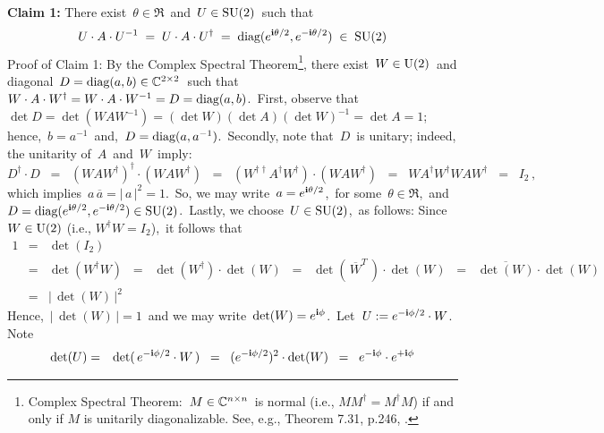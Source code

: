 \begin{enumerate}
	\vskip 0.3cm
	\noindent
	\textbf{Claim 1:}\quad
	There exist
	\,$\theta \in \Re$\,
	and
	\,$U \in \textnormal{SU}(2)$\,
	such that
	\begin{equation*}
	U \cdot A \cdot U^{-1}
	\; = \;
		U \cdot A \cdot U^{\dagger}
	\; = \;
		\textnormal{diag}(e^{\textnormal{\bf i}\theta/2},e^{-\textnormal{\bf i}\theta/2})
	\; \in \;
		\textnormal{SU}(2)
	\end{equation*}
	\vskip 0.1cm
	\noindent
	Proof of Claim 1:\;\;
	By the {\color{red}Complex Spectral Theorem}\footnote{Complex Spectral Theorem:
	\,$M \in \mathbb{C}^{n \times n}$\,
	is normal (i.e., $MM^{\dagger} = M^{\dagger}M$)
	if and only if $M$ is unitarily diagonalizable.
	See, e.g., Theorem 7.31, p.246, \cite{Axler2024}.},
	there exist \,$W \in \textnormal{U}(2)$\, and diagonal
	\,$D = \textnormal{diag}(a,b) \in \mathbb{C}^{2 \times 2}$\,
	such that
	\,$W \cdot A \cdot W^{\dagger} = W \cdot A \cdot W^{-1} = D = \textnormal{diag}(a,b)$.\,
	First, observe that 
	\,$\det D = \det(WAW^{-1}) = (\det W)(\det A)(\det W)^{-1} = \det A = 1$;\,
	hence,
	\,$b = a^{-1}$\,
	and,
	\,$D = \textnormal{diag}(a,a^{-1})$.\,
	Secondly, note that
	\,$D$\, is unitary; indeed, the unitarity of \,$A$\, and \,$W$\, imply:
	\begin{equation*}
	D^{\dagger} \cdot D
	\;\; = \;\;
		(W A W^{\dagger})^{\dagger} \cdot (W A W^{\dagger})
	\;\; = \;\;
		(W^{\dagger\dagger} A^{\dagger} W^{\dagger}) \cdot (W A W^{\dagger})
	\;\; = \;\;
		W A^{\dagger} W^{\dagger} W A W^{\dagger}
	\;\; = \;\;
		I_{2}\,,
	\end{equation*}
	which implies
	\,$a\,\overline{a} = \vert\,a\,\vert^{2} = 1$.\,
	So, we may write
	\,$a = e^{\textnormal{\bf i}\theta/2}$,\,
	for some
	\,$\theta \in \Re$,\,
	and
	\,$D = \textnormal{diag}(e^{\textnormal{\bf i}\theta/2},e^{-\textnormal{\bf i}\theta/2}) \in \textnormal{SU}(2)$.\,
	Lastly, we choose \,$U \in \textnormal{SU}(2)$,\, as follows:
	Since \,$W \in \textnormal{U}(2)$ (i.e., $W^{\dagger}W = I_{2}$),\,
	it follows that
	\begin{eqnarray*}
	1
	& = &
		\det(I_{2})
	\\
	& = &
		\det(W^{\dagger}W)
	\;\; = \;\;
		\det(W^{\dagger})\cdot\det(W)
	\;\; = \;\;
		\det(\,\overline{W}^{T}\,)\cdot\det(W)
	\;\; = \;\;
		\overline{\det(W)}\cdot\det(W)
	\\
	& = &
		\vert\,\det(W)\,\vert^{2}
	\end{eqnarray*}
	Hence,
	\,$\vert\,\det(W)\,\vert = 1$\,
	and we may write
	\,$\det(W)  = e^{\textnormal{\bf i}\phi}$.\,
	Let \,$U := e^{-\textnormal{\bf i}\phi/2} \cdot W$.\,
	Note
	\begin{eqnarray*}
	\det(U)
	& = &
		\det(\,e^{-\i\phi/2} \cdot W\,)
	\;\; = \;\;
		(e^{-\i\phi/2})^{2} \cdot \det(W)
	\;\; = \;\;
		e^{-\i\phi} \cdot e^{+\i\phi}

\end{eqnarray*}
\end{enumerate}
